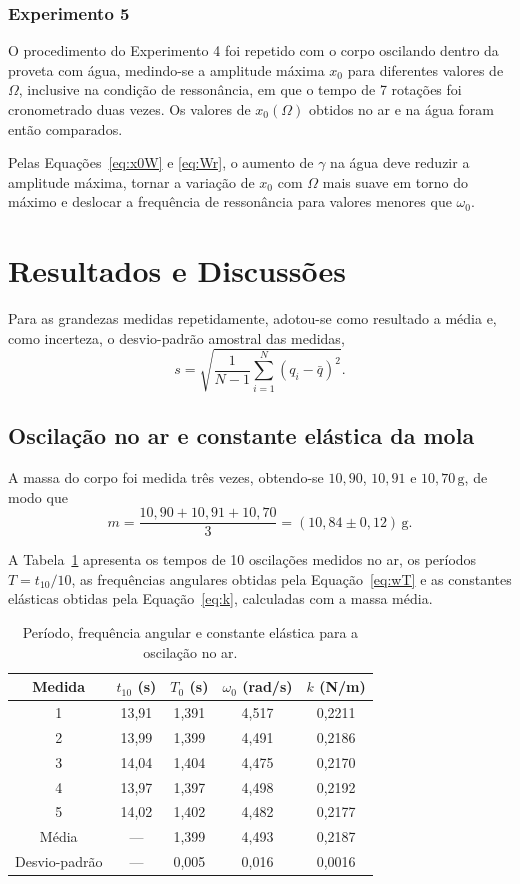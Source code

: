 \documentclass[12pt, a4paper]{article}
\newcommand{\un}[1]{\,\mathrm{#1}}
\newcommand{\fonte}[1]{\par\vspace{2pt}{\footnotesize Fonte: #1}}
\begin{document}
\subsubsection{Experimento 5}

O procedimento do Experimento 4 foi repetido com o corpo oscilando dentro da proveta com água, medindo-se a amplitude máxima $x_0$ para diferentes valores de $\Omega$, inclusive na condição de ressonância, em que o tempo de 7 rotações foi cronometrado duas vezes. Os valores de $x_0(\Omega)$ obtidos no ar e na água foram então comparados.

Pelas Equações~\eqref{eq:x0W} e \eqref{eq:Wr}, o aumento de $\gamma$ na água deve reduzir a amplitude máxima, tornar a variação de $x_0$ com $\Omega$ mais suave em torno do máximo e deslocar a frequência de ressonância para valores menores que $\omega_0$.

\section{Resultados e Discussões}

Para as grandezas medidas repetidamente, adotou-se como resultado a média e, como incerteza, o desvio-padrão amostral das medidas,
\[
s=\sqrt{\frac{1}{N-1}\sum_{i=1}^{N}\left(q_i-\bar{q}\right)^2}.
\]

\subsection{Oscilação no ar e constante elástica da mola}

A massa do corpo foi medida três vezes, obtendo-se $10{,}90$, $10{,}91$ e $10{,}70\un{g}$, de modo que
\[
m=\frac{10{,}90+10{,}91+10{,}70}{3}=(10{,}84\pm0{,}12)\un{g}.
\]

A Tabela~\ref{tab:ar} apresenta os tempos de 10 oscilações medidos no ar, os períodos $T=t_{10}/10$, as frequências angulares obtidas pela Equação~\eqref{eq:wT} e as constantes elásticas obtidas pela Equação~\eqref{eq:k}, calculadas com a massa média.

\begin{table}[H]
\centering
\caption{Período, frequência angular e constante elástica para a oscilação no ar.}
\label{tab:ar}
\begin{tabular}{ccccc}
\toprule
Medida & $t_{10}$ (s) & $T_0$ (s) & $\omega_0$ (rad/s) & $k$ (N/m) \\
\midrule
1 & 13,91 & 1,391 & 4,517 & 0,2211 \\
2 & 13,99 & 1,399 & 4,491 & 0,2186 \\
3 & 14,04 & 1,404 & 4,475 & 0,2170 \\
4 & 13,97 & 1,397 & 4,498 & 0,2192 \\
5 & 14,02 & 1,402 & 4,482 & 0,2177 \\
\midrule
Média & --- & 1,399 & 4,493 & 0,2187 \\
Desvio-padrão & --- & 0,005 & 0,016 & 0,0016 \\
\bottomrule
\end{tabular}
\fonte{Elaborada pelos autores.}
\end{table}
\end{document}
